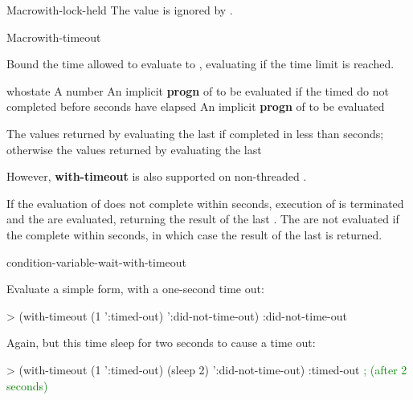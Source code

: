 \begin{functiondoc}{Macro}{with-lock-held}{\code{(} 
    \code{)}
    \superstar{} 
    \returns{} \superstar}
\fnnote The  value is ignored by
.

\end{functiondoc}


\begin{functiondoc}{Macro}{with-timeout}{\code{(} 
    \superstar{}\code{)}
    \superstar{} 
    \returns{} \superstar}
\fnsyntax

\fnpurpose Bound the time allowed to evaluate  to
, evaluating  if the time limit is reached.

\fnpackage {}

\fnmodule {}

\fnargs
\begin{args}{whostate}
\arg[seconds] A number
 An implicit \textbf{progn} of  to be
evaluated if the timed  do not completed before 
seconds have elapsed
\arg[forms] An implicit \textbf{progn} of  to be evaluated
\end{args}

\fnreturns The values returned by evaluating the last  if
completed in less than  seconds; otherwise the values returned by
evaluating the last 

\fnerrors \nothreads{} However, \textbf{with-timeout} is also
supported on non-threaded .

\fndescription If the evaluation of  does not complete within
 seconds, execution of  is terminated and the
 are evaluated, returning the result of the last
. The  are not evaluated if the
 complete within  seconds, in which case the result of the
last  is returned.

\begin{alsos}{condition-variable-wait-with-timeout}
\end{alsos}

\fnexamples
Evaluate a simple form, with a one-second time out:
%
\W\supp
\begin{example}
> (with-timeout (1 ':timed-out) 
     ':did-not-time-out)
:did-not-time-out
\end{example}
%
Again, but this time sleep for two seconds to cause a time out:
%
\W\supp\notpretop
\begin{example}
> (with-timeout (1 ':timed-out)
     (sleep 2) 
     ':did-not-time-out)
:timed-out              \textrm{\textcolor{green}{; (after 2 seconds)}}
\end{example}

\end{functiondoc}

